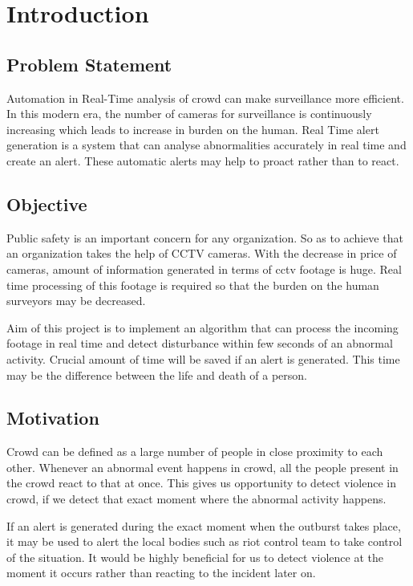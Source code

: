 \chapter{Introduction}

\section{Problem Statement}
Automation in Real-Time analysis of crowd can make surveillance more efficient. In this modern era, the number of cameras for surveillance is continuously increasing which leads to increase in burden on the human. Real Time alert generation is a system that can analyse abnormalities accurately in real time and create an alert. These automatic alerts may help to proact rather than to react. 

\section{Objective}
Public safety is an important concern for any organization. So as to achieve that an organization takes the help of CCTV cameras. With the decrease in price of cameras, amount of information generated in terms of cctv footage is huge. Real time processing of this footage is required so that the burden on the human surveyors may be decreased.
\par
Aim of this project is to implement an algorithm that can process the incoming footage in real time and detect disturbance within few seconds of an abnormal activity. Crucial amount of time will be saved if an alert is generated. This time may be the difference between the life and death of a person.

\section{Motivation}
Crowd can be defined as a large number of people in close proximity to each other. Whenever an abnormal event happens in crowd, all the people present in the crowd react to that at once. This gives us opportunity to  detect violence in crowd, if we detect that exact moment where the abnormal activity happens.
\par 
If an alert is generated during the exact moment when the outburst takes place, it may be used to alert the local bodies such as riot control team to take control of the situation. It would be highly beneficial for us to detect violence at the moment it occurs rather than reacting to the incident later on.

